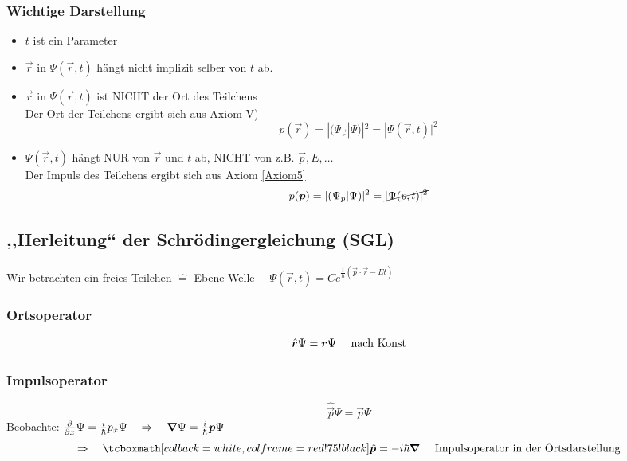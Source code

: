 \subsubsection{Wichtige Darstellung}

\begin{itemize}
	\item $t$ ist ein Parameter
	\item $\vec{r}$ in $\Psi(\vec{r},t)$ hängt nicht implizit selber von $t$ ab.
	\item $\vec{r}$ in $\Psi(\vec{r},t)$ ist \color{red} NICHT \color{black} der Ort des Teilchens \mau\\
	Der Ort der Teilchens ergibt sich aus Axiom V)
	$$p(\vec{r}) = |(\Psi_{\vec{r}}|\Psi)|^2 = |\Psi(\vec{r},t)|^2$$
	\item $\Psi(\vec{r},t)$ hängt \color{red} NUR \color{black} von $\vec{r}$ und $t$ ab, \color{red} NICHT \color{black} von z.B. $\vec{p}, E, \dots$\\
	Der Impuls des Teilchens ergibt sich aus Axiom \ref{Axiom5}
	$$p(\vec{p}) = |(\Psi_p | \Psi)|^2 = \cancel{| \Psi(p,t)|^2}$$
\end{itemize}

\subsection{,,Herleitung`` der Schrödingergleichung (SGL)}

Wir betrachten ein freies Teilchen $ \widehat{=} $ Ebene Welle $ \quad \Psi(\vec{r},t) = C e^{\frac{i}{\hbar} (\vec{p} \cdot \vec{r} - E t)} $

\subsubsection{Ortsoperator}

\begin{equation*}
\hat{\vec{r}} \Psi = \vec{r} \Psi \quad \tx{ nach Konst}
\end{equation*}

\subsubsection{Impulsoperator}

\begin{equation*}
\hat{\vec{p}} \Psi = \vec{p} \Psi
\end{equation*}
Beobachte: $ \prt{}{x} \Psi = \frac{i}{\hbar} p_x \Psi \quad \Rightarrow \quad \vabla \Psi = \frac{i}{\hbar} \vec{p} \Psi $
\begin{equation*}
\Rightarrow \quad \rmbox{\hat{\vec{p}} = - i \hbar \vabla} \quad \tx{ Impulsoperator in der Ortsdarstellung}
\end{equation*}

